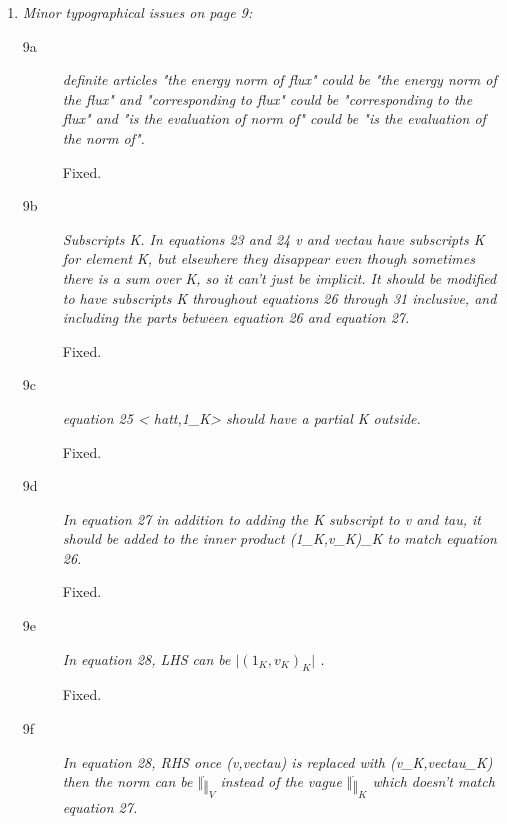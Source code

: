 \documentclass[11pt,c]{article}
\begin{document}
\begin{enumerate}

  \item {\em  Minor typographical issues on page 9:}
\begin{description}
  \item[9a] {\em  definite articles "the energy norm of flux" could be "the energy norm of the flux" and "corresponding to flux" could be "corresponding to the flux" and "is the evaluation of norm of" could be "is the evaluation of the norm of".}

Fixed.

  \item[9b] {\em  Subscripts K.  In equations 23 and 24 v and vec{tau} have subscripts K for element K, but elsewhere they disappear even though sometimes there is a sum over K, so it can't just be implicit.  It should be modified to have subscripts K throughout equations 26 through 31 inclusive, and including the parts between equation 26 and equation 27.}

Fixed.

  \item [9c] {\em  equation 25 < hat{t},1\_K> should have a partial K outside.}

Fixed.

  \item [9d] {\em  In equation 27 in addition to adding the K subscript to v and tau, it should be added to the inner product (1\_K,v\_K)\_K to match equation 26.}

Fixed.

  \item [9e] {\em  In equation 28, LHS can be $\vert (1_K,v_K)_K\vert$ .}

Fixed.

  \item[9f] {\em In equation 28, RHS once (v,vec{tau}) is replaced with (v\_K,vec{tau}\_K) 
then the norm can be $\Vert  \dot \Vert_V$ instead of the vague $\Vert  \dot \Vert_K$ which doesn't match equation 27.}


\end{description}
\end{enumerate}
\end{document}
